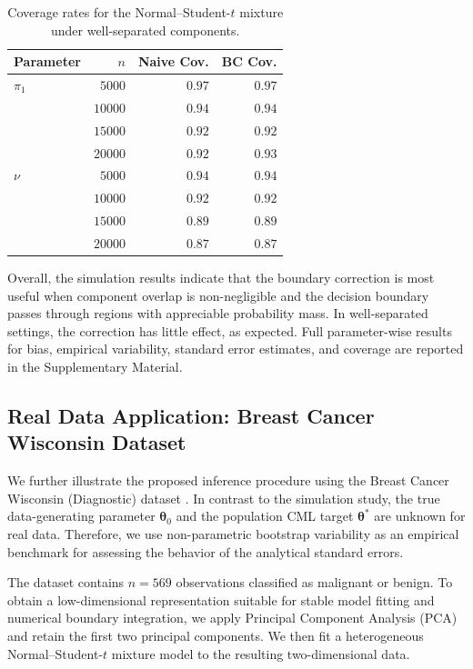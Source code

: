 \documentclass[pdflatex,sn-mathphys-ay]{sn-jnl}%
\let\oldtheta\theta
\renewcommand{\theta}{\boldsymbol{\oldtheta}}
\theoremstyle{thmstyleone}%
\theoremstyle{thmstyletwo}%
\theoremstyle{thmstylethree}%
\begin{document}
\begin{table}[htbp]
\centering
\caption{\label{tab:nt_well_cov_sp}Coverage rates for the Normal--Student-$t$ mixture under well-separated components.}
\begin{tabular}{lrrr}
\toprule
Parameter & $n$ & Naive Cov. & BC Cov. \\
\midrule
$\pi_1$ & $5000$ & $0.97$ & $0.97$ \\
 & $10000$ & $0.94$ & $0.94$ \\
 & $15000$ & $0.92$ & $0.92$ \\
 & $20000$ & $0.92$ & $0.93$ \\
$\nu$ & $5000$ & $0.94$ & $0.94$ \\
 & $10000$ & $0.92$ & $0.92$ \\
 & $15000$ & $0.89$ & $0.89$ \\
 & $20000$ & $0.87$ & $0.87$ \\
\bottomrule
\end{tabular}
\end{table}

Overall, the simulation results indicate that the boundary correction is most useful when component overlap is non-negligible and the decision boundary passes through regions with appreciable probability mass. In well-separated settings, the correction has little effect, as expected. Full parameter-wise results for bias, empirical variability, standard error estimates, and coverage are reported in the Supplementary Material.


\subsection{Real Data Application: Breast Cancer Wisconsin Dataset}

We further illustrate the proposed inference procedure using the Breast Cancer Wisconsin (Diagnostic) dataset \citep{street1993nuclear}. In contrast to the simulation study, the true data-generating parameter $\boldsymbol{\theta}_0$ and the population CML target $\boldsymbol{\theta}^*$ are unknown for real data. Therefore, we use non-parametric bootstrap variability as an empirical benchmark for assessing the behavior of the analytical standard errors.

The dataset contains $n=569$ observations classified as malignant or benign. To obtain a low-dimensional representation suitable for stable model fitting and numerical boundary integration, we apply Principal Component Analysis (PCA) \citep{jolliffe2002principal} and retain the first two principal components. We then fit a heterogeneous Normal--Student-$t$ mixture model to the resulting two-dimensional data.
\end{document}
